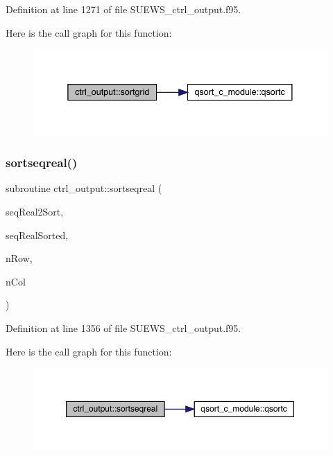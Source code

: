 Definition at line 1271 of file S\+U\+E\+W\+S\+\_\+ctrl\+\_\+output.\+f95.

Here is the call graph for this function\+:\nopagebreak
\begin{figure}[H]
\begin{center}
\leavevmode
\includegraphics[width=338pt]{namespacectrl__output_a1807dd1d886e5fd090461e140156758b_cgraph}
\end{center}
\end{figure}
\mbox{\label{namespacectrl__output_a093211a59ed2a27d1d853afc548146df}} 
\subsubsection{\texorpdfstring{sortseqreal()}{sortseqreal()}}
{\footnotesize\ttfamily subroutine ctrl\+\_\+output\+::sortseqreal (\begin{DoxyParamCaption}\item[{real(kind(1d0)), dimension(nrow$\ast$ncol), intent(in)}]{seq\+Real2\+Sort,  }\item[{real(kind(1d0)), dimension(nrow$\ast$ncol), intent(out)}]{seq\+Real\+Sorted,  }\item[{integer}]{n\+Row,  }\item[{integer}]{n\+Col }\end{DoxyParamCaption})}



Definition at line 1356 of file S\+U\+E\+W\+S\+\_\+ctrl\+\_\+output.\+f95.

Here is the call graph for this function\+:\nopagebreak
\begin{figure}[H]
\begin{center}
\leavevmode
\includegraphics[width=350pt]{namespacectrl__output_a093211a59ed2a27d1d853afc548146df_cgraph}
\end{center}
\end{figure}
\mbox{\label{namespacectrl__output_ae9a62c39f1b7598a639718dd95127977}} 

